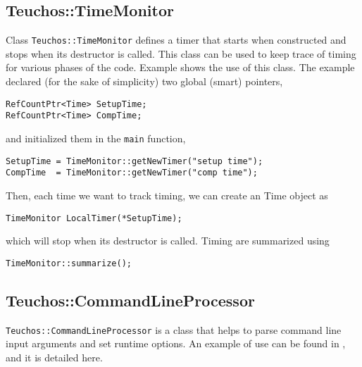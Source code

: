 
\subsection{Teuchos::TimeMonitor}
\label{sec:teuchos:TimeMonitor}

Class \verb!Teuchos::TimeMonitor! defines a timer that starts when
constructed and stops when its destructor is called. This class can be
used to keep trace of timing for various phases of the code. Example
 shows the use of this class. The example
declared (for the sake of simplicity) two global (smart) pointers,
\begin{verbatim}
RefCountPtr<Time> SetupTime;
RefCountPtr<Time> CompTime;
\end{verbatim}
and initialized them in the \verb!main! function,
\begin{verbatim}
SetupTime = TimeMonitor::getNewTimer("setup time");
CompTime  = TimeMonitor::getNewTimer("comp time");
\end{verbatim}
Then, each time we want to track timing, we can create an Time object as
\begin{verbatim}
TimeMonitor LocalTimer(*SetupTime);
\end{verbatim}
which will stop when its destructor is called. Timing are summarized
using
\begin{verbatim}
TimeMonitor::summarize();
\end{verbatim}


\subsection{Teuchos::CommandLineProcessor}
\label{sec:teuchos:CLP}

\verb!Teuchos::CommandLineProcessor! is a class that helps to parse command
line input arguments and set runtime options. An example of use can be
found in , and it is detailed here.

